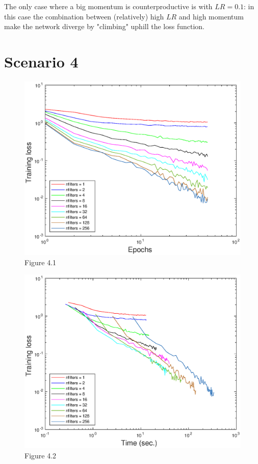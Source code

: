 \documentclass{article}
\begin{document}
    The only case where a big momentum is counterproductive is with $LR = 0.1$: in this case the combination between (relatively) high $LR$ and high momentum make the network diverge by "climbing" uphill the loss function.
    
    
    
    
\section*{Scenario 4}
	\begin{figure}[!htb]
        \centering
        \includegraphics[width=\textwidth]{figures/sc4_tr_loss}
        \captionsetup{labelformat=empty}
        \caption{Figure 4.1}
    \end{figure}
    \begin{figure}[!htb]
        \centering
        \includegraphics[width=\textwidth]{figures/sc4_tr_loss_time}
        \captionsetup{labelformat=empty}
        \caption{Figure 4.2}
    \end{figure}
\end{document}
